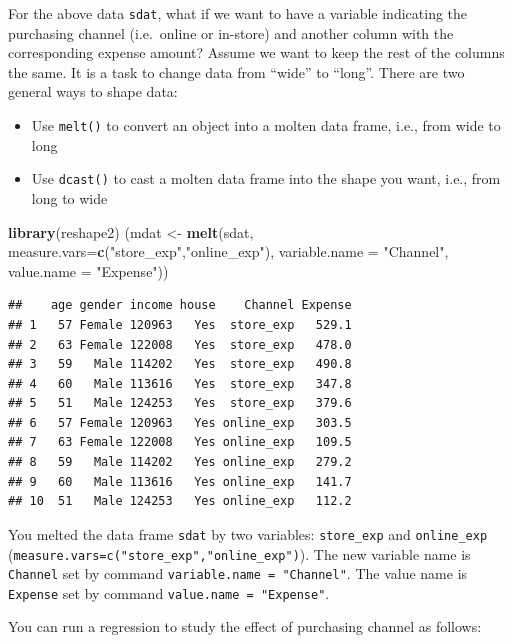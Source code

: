 \documentclass[12pt,]{krantz}
\newenvironment{Shaded}{\begin{snugshade}}{\end{snugshade}}
\newcommand{\KeywordTok}[1]{\textcolor[rgb]{0.13,0.29,0.53}{\textbf{#1}}}
\newcommand{\DataTypeTok}[1]{\textcolor[rgb]{0.13,0.29,0.53}{#1}}
\newcommand{\StringTok}[1]{\textcolor[rgb]{0.31,0.60,0.02}{#1}}
\newcommand{\NormalTok}[1]{#1}
\providecommand{\tightlist}{%
  \setlength{\itemsep}{0pt}\setlength{\parskip}{0pt}}
\theoremstyle{definition}
\theoremstyle{definition}
\theoremstyle{definition}
\theoremstyle{remark}
\begin{document}
For the above data \texttt{sdat}, what if we want to have a variable
indicating the purchasing channel (i.e.~online or in-store) and another
column with the corresponding expense amount? Assume we want to keep the
rest of the columns the same. It is a task to change data from ``wide''
to ``long''. There are two general ways to shape data:

\begin{itemize}
\tightlist
\item
  Use \texttt{melt()} to convert an object into a molten data frame,
  i.e., from wide to long
\item
  Use \texttt{dcast()} to cast a molten data frame into the shape you
  want, i.e., from long to wide
\end{itemize}

\begin{Shaded}
\begin{Highlighting}[]
\KeywordTok{library}\NormalTok{(reshape2)}
\NormalTok{(mdat <-}\StringTok{ }\KeywordTok{melt}\NormalTok{(sdat, }\DataTypeTok{measure.vars=}\KeywordTok{c}\NormalTok{(}\StringTok{"store_exp"}\NormalTok{,}\StringTok{"online_exp"}\NormalTok{),}
              \DataTypeTok{variable.name =} \StringTok{"Channel"}\NormalTok{,}
              \DataTypeTok{value.name =} \StringTok{"Expense"}\NormalTok{))}
\end{Highlighting}
\end{Shaded}

\begin{verbatim}
##    age gender income house    Channel Expense
## 1   57 Female 120963   Yes  store_exp   529.1
## 2   63 Female 122008   Yes  store_exp   478.0
## 3   59   Male 114202   Yes  store_exp   490.8
## 4   60   Male 113616   Yes  store_exp   347.8
## 5   51   Male 124253   Yes  store_exp   379.6
## 6   57 Female 120963   Yes online_exp   303.5
## 7   63 Female 122008   Yes online_exp   109.5
## 8   59   Male 114202   Yes online_exp   279.2
## 9   60   Male 113616   Yes online_exp   141.7
## 10  51   Male 124253   Yes online_exp   112.2
\end{verbatim}

You melted the data frame \texttt{sdat} by two variables:
\texttt{store\_exp} and \texttt{online\_exp}
(\texttt{measure.vars=c("store\_exp","online\_exp")}). The new variable
name is \texttt{Channel} set by command
\texttt{variable.name\ =\ "Channel"}. The value name is \texttt{Expense}
set by command \texttt{value.name\ =\ "Expense"}.

You can run a regression to study the effect of purchasing channel as
follows:
\end{document}
